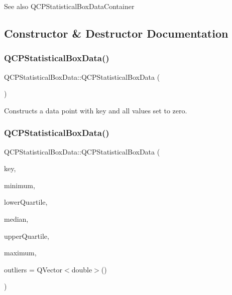 \begin{DoxySeeAlso}{See also}
Q\+C\+P\+Statistical\+Box\+Data\+Container 
\end{DoxySeeAlso}


\subsection{Constructor \& Destructor Documentation}
\mbox{\label{class_q_c_p_statistical_box_data_ab96c4b93670a8dcac8a3d4080fd722ee}} 
\subsubsection{\texorpdfstring{Q\+C\+P\+Statistical\+Box\+Data()}{QCPStatisticalBoxData()}\hspace{0.1cm}{\footnotesize\ttfamily [1/2]}}
{\footnotesize\ttfamily Q\+C\+P\+Statistical\+Box\+Data\+::\+Q\+C\+P\+Statistical\+Box\+Data (\begin{DoxyParamCaption}{ }\end{DoxyParamCaption})}

Constructs a data point with key and all values set to zero. \mbox{\label{class_q_c_p_statistical_box_data_a66b0c6d39765d0feb49c286fba4e4ef5}} 
\subsubsection{\texorpdfstring{Q\+C\+P\+Statistical\+Box\+Data()}{QCPStatisticalBoxData()}\hspace{0.1cm}{\footnotesize\ttfamily [2/2]}}
{\footnotesize\ttfamily Q\+C\+P\+Statistical\+Box\+Data\+::\+Q\+C\+P\+Statistical\+Box\+Data (\begin{DoxyParamCaption}\item[{double}]{key,  }\item[{double}]{minimum,  }\item[{double}]{lower\+Quartile,  }\item[{double}]{median,  }\item[{double}]{upper\+Quartile,  }\item[{double}]{maximum,  }\item[{const Q\+Vector$<$ double $>$ \&}]{outliers = {\ttfamily QVector$<$double$>$()} }\end{DoxyParamCaption})}

